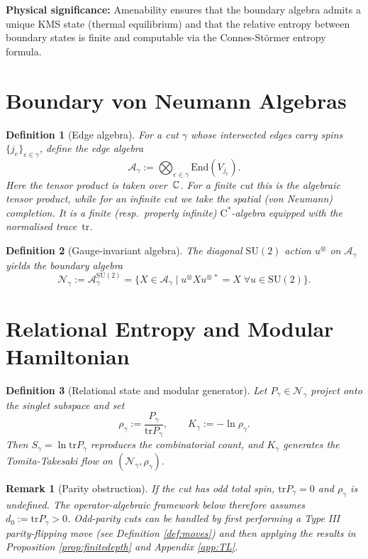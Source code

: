\documentclass[11pt]{article}
\newtheorem{definition}{Definition}[section]
\newtheorem{remark}{Remark}[section]
\begin{document}
\textbf{Physical significance:} Amenability ensures that the boundary algebra admits
a unique KMS state (thermal equilibrium) and that the relative entropy between
boundary states is finite and computable via the Connes-Störmer entropy formula.

\section{Boundary von Neumann Algebras}

\begin{definition}[Edge algebra]
  For a cut $\gamma$ whose intersected edges carry spins
  $\{j_e\}_{e\in\gamma}$, define the \emph{edge algebra}
  \[
    \mathcal A_{\gamma}
    := \bigotimes_{e\in\gamma} \mathrm{End}(V_{j_e}).
  \]
  Here the tensor product is taken over~$\Bbb C$.
  For a finite cut this is the algebraic tensor product,
  while for an infinite cut we take the spatial (von Neumann) completion.
  It is a finite (resp.\ properly infinite) $\mathrm C^\ast$-algebra
  equipped with the normalised trace~$\mathrm{tr}$.
\end{definition}

\begin{definition}[Gauge-invariant algebra]
  The diagonal $\mathrm{SU}(2)$ action $u^{\otimes}$ on
  $\mathcal A_\gamma$ yields the \emph{boundary algebra}
  \[
    \mathcal N_{\gamma} :=
    \mathcal A_{\gamma}^{\mathrm{SU}(2)}
    =
    \{X\in\mathcal A_{\gamma}\mid
    u^{\otimes} X u^{\otimes\,*}=X\;\forall u\in \mathrm{SU}(2)\}.
  \]
\end{definition}

\section{Relational Entropy and Modular Hamiltonian}

\begin{definition}[Relational state and modular generator]
  Let $P_{\gamma}\in\mathcal N_{\gamma}$ project onto the singlet subspace and set
  \[
    \rho_{\gamma}:=\frac{P_{\gamma}}{\mathrm{tr}P_{\gamma}},\qquad
    K_{\gamma}:=-\ln\rho_{\gamma}.
  \]
  Then $S_{\gamma}=\ln\mathrm{tr}P_{\gamma}$ reproduces the combinatorial count,
  and $K_{\gamma}$ generates the Tomita-Takesaki flow on
  $(\mathcal N_{\gamma},\rho_{\gamma})$.
\end{definition}

\begin{remark}[Parity obstruction]\label{rem:parity}
  If the cut has \emph{odd} total spin, $\mathrm{tr}P_{\gamma}=0$ and
  $\rho_{\gamma}$ is undefined.
  The operator-algebraic framework below therefore assumes
  $d_0:=\mathrm{tr}P_{\gamma}>0$.
  Odd-parity cuts can be handled by first performing a Type III
  parity-flipping move (see Definition \ref{def:moves}) and then applying the
  results in Proposition \ref{prop:finitedepth} and Appendix \ref{app:TL}.
\end{remark}
\end{document}
